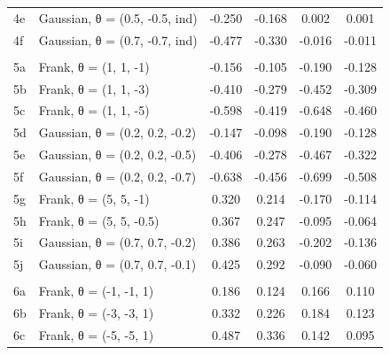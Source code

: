 \documentclass[
]{article}
\begin{document}
\begin{longtable}[t]{llcccc}
\hspace{1em}4e & Gaussian, θ = (0.5, -0.5, ind) & -0.250 & -0.168 & 0.002 & 0.001\\
\hspace{1em}4f & Gaussian, θ = (0.7, -0.7, ind) & -0.477 & -0.330 & -0.016 & -0.011\\
\addlinespace[0.3em]
\multicolumn{6}{l}{\textbf{Scenario 5: (+, +, -)}}\\
\hspace{1em}5a & Frank, θ = (1, 1, -1) & -0.156 & -0.105 & -0.190 & -0.128\\
\hspace{1em}5b & Frank, θ = (1, 1, -3) & -0.410 & -0.279 & -0.452 & -0.309\\
\hspace{1em}5c & Frank, θ = (1, 1, -5) & -0.598 & -0.419 & -0.648 & -0.460\\
\hspace{1em}5d & Gaussian, θ = (0.2, 0.2, -0.2) & -0.147 & -0.098 & -0.190 & -0.128\\
\hspace{1em}5e & Gaussian, θ = (0.2, 0.2, -0.5) & -0.406 & -0.278 & -0.467 & -0.322\\
\hspace{1em}5f & Gaussian, θ = (0.2, 0.2, -0.7) & -0.638 & -0.456 & -0.699 & -0.508\\
\hspace{1em}5g & Frank, θ = (5, 5, -1) & 0.320 & 0.214 & -0.170 & -0.114\\
\hspace{1em}5h & Frank, θ = (5, 5, -0.5) & 0.367 & 0.247 & -0.095 & -0.064\\
\hspace{1em}5i & Gaussian, θ = (0.7, 0.7, -0.2) & 0.386 & 0.263 & -0.202 & -0.136\\
\hspace{1em}5j & Gaussian, θ = (0.7, 0.7, -0.1) & 0.425 & 0.292 & -0.090 & -0.060\\
\addlinespace[0.3em]
\multicolumn{6}{l}{\textbf{Scenario 6: (-, -, +)}}\\
\hspace{1em}6a & Frank, θ = (-1, -1, 1) & 0.186 & 0.124 & 0.166 & 0.110\\
\hspace{1em}6b & Frank, θ = (-3, -3, 1) & 0.332 & 0.226 & 0.184 & 0.123\\
\hspace{1em}6c & Frank, θ = (-5, -5, 1) & 0.487 & 0.336 & 0.142 & 0.095\\

\end{longtable}
\end{document}

